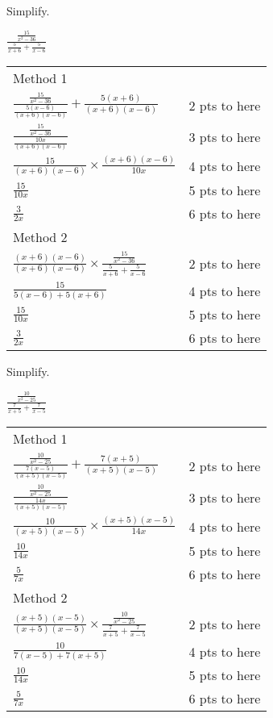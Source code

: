 {
	Simplify.\par
	$\displaystyle \frac{\frac{15}{x^2-36}}{\frac{5}{x+6} +\frac{5}{x-6}}$
}
{
	\begin{tabular}{l r}
	Method 1\\
	$\frac{\frac{15}{x^2-36}}{\frac{5(x-6)}{(x+6)(x-6)}} +\frac{5(x+6)}{(x+6)(x-6)}$ & 2 pts to here\\
	$\frac{\frac{15}{x^2-36}}{\frac{10x}{(x+6)(x-6)}}$ & 3 pts to here\\
	$\frac{15}{(x+6)(x-6)} \times \frac{(x+6)(x-6)}{10x}$ & 4 pts to here\\
	$\frac{15}{10x}$ & 5 pts to here\\
	$\frac{3}{2x}$ & 6 pts to here\\
	Method 2\\
	$ \frac{(x+6)(x-6)}{(x+6)(x-6)} \times \frac{\frac{15}{x^2-36}}{\frac{5}{x+6} +\frac{5}{x-6}}$ & 2 pts to here\\
	$\frac{15}{5(x-6) +5(x+6)}$ & 4 pts to here\\
	$\frac{15}{10x}$ & 5 pts to here\\
	$\frac{3}{2x}$ & 6 pts to here
	\end{tabular}
}

{
	Simplify.\par
	$\displaystyle \frac{\frac{10}{x^2-25}}{\frac{7}{x+5} +\frac{7}{x-5}}$
}
{
	\begin{tabular}{l r}
	Method 1\\
	$\frac{\frac{10}{x^2-25}}{\frac{7(x-5)}{(x+5)(x-5)}} +\frac{7(x+5)}{(x+5)(x-5)}$ & 2 pts to here\\
	$\frac{\frac{10}{x^2-25}}{\frac{14x}{(x+5)(x-5)}}$ & 3 pts to here\\
	$\frac{10}{(x+5)(x-5)} \times \frac{(x+5)(x-5)}{14x}$ & 4 pts to here\\
	$\frac{10}{14x}$ & 5 pts to here\\
	$\frac{5}{7x}$ & 6 pts to here\\
	Method 2\\
	$ \frac{(x+5)(x-5)}{(x+5)(x-5)} \times \frac{\frac{10}{x^2-25}}{\frac{7}{x+5} +\frac{7}{x-5}}$ & 2 pts to here\\
	$\frac{10}{7(x-5) +7(x+5)}$ & 4 pts to here\\
	$\frac{10}{14x}$ & 5 pts to here\\
	$\frac{5}{7x}$ & 6 pts to here
	\end{tabular}
}
